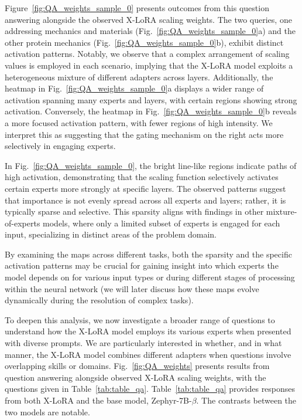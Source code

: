 Figure~\ref{fig:QA_weights_sample_0} presents outcomes from this question answering alongside the observed X-LoRA scaling weights. The two queries, one addressing mechanics and materials (Fig.~\ref{fig:QA_weights_sample_0}a) and the other protein mechanics (Fig.~\ref{fig:QA_weights_sample_0}b), exhibit distinct activation patterns. Notably, we observe that a complex arrangement of scaling values is employed in each scenario, implying that the X-LoRA model exploits a heterogeneous mixture of different adapters across layers. Additionally, the heatmap in Fig.~\ref{fig:QA_weights_sample_0}a displays a wider range of activation spanning many experts and layers, with certain regions showing strong activation. Conversely, the heatmap in Fig.~\ref{fig:QA_weights_sample_0}b reveals a more focused activation pattern, with fewer regions of high intensity. We interpret this as suggesting that the gating mechanism on the right acts more selectively in engaging experts.

In Fig.~\ref{fig:QA_weights_sample_0}, the bright line-like regions indicate paths of high activation, demonstrating that the scaling function selectively activates certain experts more strongly at specific layers. The observed patterns suggest that importance is not evenly spread across all experts and layers; rather, it is typically sparse and selective. This sparsity aligns with findings in other mixture-of-experts models, where only a limited subset of experts is engaged for each input, specializing in distinct areas of the problem domain.

By examining the maps across different tasks, both the sparsity and the specific activation patterns may be crucial for gaining insight into which experts the model depends on for various input types or during different stages of processing within the neural network (we will later discuss how these maps evolve dynamically during the resolution of complex tasks).

To deepen this analysis, we now investigate a broader range of questions to understand how the X-LoRA model employs its various experts when presented with diverse prompts. We are particularly interested in whether, and in what manner, the X-LoRA model combines different adapters when questions involve overlapping skills or domains. Fig.~\ref{fig:QA_weights} presents results from question answering alongside observed X-LoRA scaling weights, with the questions given in Table~\ref{tab:table_qa}. Table~\ref{tab:table_qa} provides responses from both X-LoRA and the base model, Zephyr-7B-$\beta$. The contrasts between the two models are notable.

